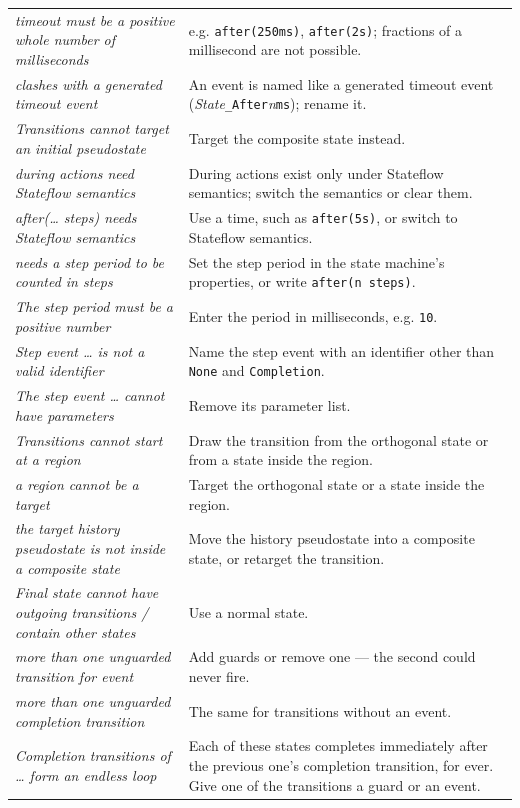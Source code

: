 \documentclass[11pt,a4paper,openany]{report}
\newcommand{\code}[1]{\texttt{#1}}
\begin{document}
\begin{longtable}{@{}p{6.3cm}p{8.1cm}@{}}
\emph{timeout must be a positive whole number of milliseconds} & e.g. \code{after(250ms)}, \code{after(2s)}; fractions of a millisecond are not possible. \\
\emph{clashes with a generated timeout event} & An event is named like a generated timeout event (\textit{State}\code{\_After}\textit{n}\code{ms}); rename it. \\
\emph{Transitions cannot target an initial pseudostate} & Target the composite state instead. \\
\emph{during actions need Stateflow semantics} & During actions exist only under Stateflow semantics; switch the semantics or clear them. \\
\emph{after(\dots{} steps) needs Stateflow semantics} & Use a time, such as \code{after(5s)}, or switch to Stateflow semantics. \\
\emph{needs a step period to be counted in steps} & Set the step period in the state machine's properties, or write \code{after(n steps)}. \\
\emph{The step period must be a positive number} & Enter the period in milliseconds, e.g. \code{10}. \\
\emph{Step event \dots{} is not a valid identifier} & Name the step event with an identifier other than \code{None} and \code{Completion}. \\
\emph{The step event \dots{} cannot have parameters} & Remove its parameter list. \\
\emph{Transitions cannot start at a region} & Draw the transition from the orthogonal state or from a state inside the region. \\
\emph{a region cannot be a target} & Target the orthogonal state or a state inside the region. \\
\emph{the target history pseudostate is not inside a composite state} & Move the history pseudostate into a composite state, or retarget the transition. \\
\emph{Final state cannot have outgoing transitions / contain other states} & Use a normal state. \\
\emph{more than one unguarded transition for event} & Add guards or remove one --- the second could never fire. \\
\emph{more than one unguarded completion transition} & The same for transitions without an event. \\
\emph{Completion transitions of \dots{} form an endless loop} & Each of these states completes immediately after the previous one's completion transition, for ever. Give one of the transitions a guard or an event. \\

\end{longtable}
\end{document}
